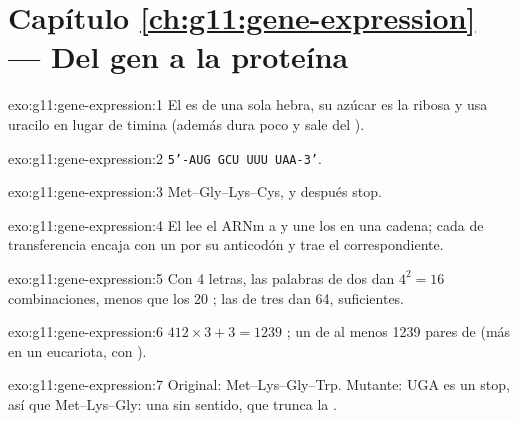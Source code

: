\section*{Capítulo \ref{ch:g11:gene-expression} --- Del gen a la proteína}

\begin{solution}{exo:g11:gene-expression:1}
El  es de una sola hebra, su azúcar es la ribosa y usa uracilo en
lugar de timina (además dura poco y sale del ).
\end{solution}

\begin{solution}{exo:g11:gene-expression:2}
\texttt{5'-AUG GCU UUU UAA-3'}.
\end{solution}

\begin{solution}{exo:g11:gene-expression:3}
Met--Gly--Lys--Cys, y después stop.
\end{solution}

\begin{solution}{exo:g11:gene-expression:4}
El  lee el ARNm  a  y une los  en una
cadena; cada  de transferencia encaja con un  por su anticodón
y trae el  correspondiente.
\end{solution}

\begin{solution}{exo:g11:gene-expression:5}
Con 4 letras, las palabras de dos dan $4^2 = 16$ combinaciones, menos
que los 20 ; las de tres dan 64, suficientes.
\end{solution}

\begin{solution}{exo:g11:gene-expression:6}
$412 \times 3 + 3 = 1239$ ; un  de al menos 1239 pares de
 (más en un eucariota, con ).
\end{solution}

\begin{solution}{exo:g11:gene-expression:7}
Original: Met--Lys--Gly--Trp. Mutante: UGA es un stop, así que
Met--Lys--Gly: una  sin sentido, que trunca la .
\end{solution}

